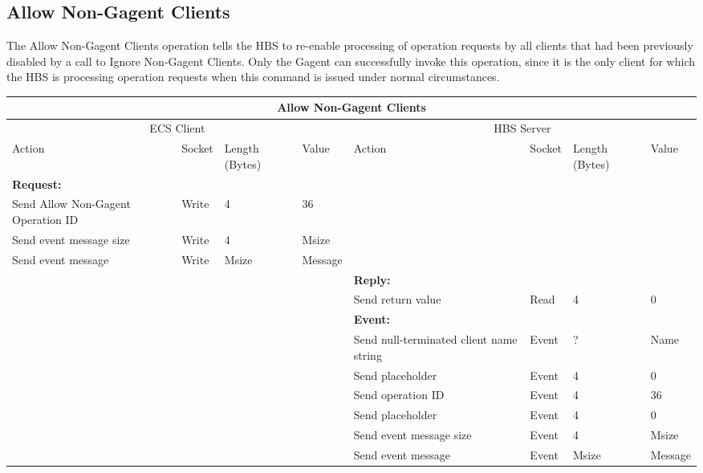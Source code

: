 \newpage
\subsection{Allow Non-Gagent Clients}

The Allow Non-Gagent Clients operation tells the HBS to re-enable
processing of operation requests by all clients that had been previously
disabled by a call to Ignore Non-Gagent Clients.  Only the Gagent can
successfully invoke this operation, since it is the only client for which
the HBS is processing operation requests when this command is issued under
normal circumstances.


\bigskip
\small
\begin{tabular}{|p{1.2in}|p{.4in}|p{.4in}|p{.5in}|p{1.2in}|p{.4in}|p{.4in}|p{.5in} |} \hline
\multicolumn{8}{|c|}{{\bf Allow Non-Gagent Clients}} \\ \hline
\multicolumn{4}{|c|}{ECS Client} & \multicolumn{4}{|c|}{HBS Server} \\ \hline
Action            & Socket & Length  
                            (Bytes)& Value & Action       & Socket & Length 
                                                                    (Bytes)& Value \\ \hline
\multicolumn{4}{|l}{{\bf Request:}}&\multicolumn{4}{|l|}{~} \\ \hline
Send Allow Non-Gagent Operation ID  & Write  & 4     & 36     &              &        &       &       \\ \hline
Send event
message size      & Write  & 4     &  Msize &         &        &       &       \\ \hline
Send event message
                  & Write  &  Msize  &  Message &     &        &       &       \\ \hline
\multicolumn{4}{|l}{~}&\multicolumn{4}{|l|}{{\bf Reply:}} \\ \hline
                  &        &       &       & Send return
                                             value        & Read   &  4    & 0       \\ \hline
\multicolumn{4}{|l}{~}&\multicolumn{4}{|l|}{{\bf Event:}} \\ \hline
                  &        &       &       & Send null-terminated client
                                             name string  & Event  &  ?    & Name  \\ \hline
                  &        &       &       & Send placeholder  & Event  &   4   &   0    \\  \hline
                  &        &       &       & Send operation 
                                             ID           & Event  &   4   &  36   \\ \hline
                  &        &       &       & Send placeholder    & Event  &   4   &  0    \\ \hline
                  &        &       &       & Send event message
                                                  size    & Event  &   4   &  Msize \\ \hline
                  &        &       &       & Send event message
                                                          & Event  & Msize & Message  \\ \hline
\end{tabular}
